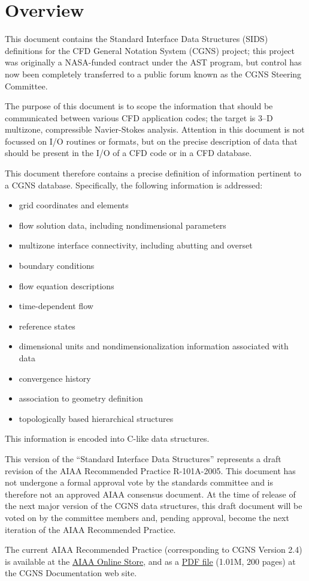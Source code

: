 \hypertarget{overview}{}
\section*{Overview}
\thispagestyle{plain}

This document contains the Standard Interface Data Structures (SIDS)
definitions for the CFD General Notation System (CGNS) project; this
project was originally a NASA-funded contract under the AST program, but
control has now been completely transferred to a public forum known as
the CGNS Steering Committee.

The purpose of this document is to scope the information that should be
communicated between various CFD application codes; the target is 3--D
multizone, compressible Navier-Stokes analysis.
Attention in this document is not focussed on I/O routines or formats,
but on the precise description of data that should be present in the I/O
of a CFD code or in a CFD database.

This document therefore contains a precise definition of information
pertinent to a CGNS database.
Specifically, the following information is addressed:
\begin{itemize}
\item grid coordinates and elements
\item flow solution data, including nondimensional parameters
\item multizone interface connectivity, including abutting and overset
\item boundary conditions
\item flow equation descriptions
\item time-dependent flow
\item reference states
\item dimensional units and nondimensionalization information associated
      with data
\item convergence history
\item association to geometry definition
\item topologically based hierarchical structures
\end{itemize}
This information is encoded into C-like data structures.

This version of the ``Standard Interface Data Structures'' represents a
draft revision of the AIAA Recommended Practice R-101A-2005.
This document has not undergone a formal approval vote by the standards
committee and is therefore not an approved AIAA consensus document.
At the time of release of the next major version of the CGNS data
structures, this draft document will be voted on by the committee
members and, pending approval, become the next iteration of the AIAA
Recommended Practice.

The current AIAA Recommended Practice (corresponding to CGNS Version
2.4) is available at the
\href{http://www.aiaa.org/content.cfm?pageid=363&id=1657}{AIAA
Online Store}, and as a
\href{http://www.grc.nasa.gov/www/cgns/sids/aiaa/R_101A_2005.pdf}{PDF file}
(1.01M, 200 pages) at the CGNS Documentation web site.

